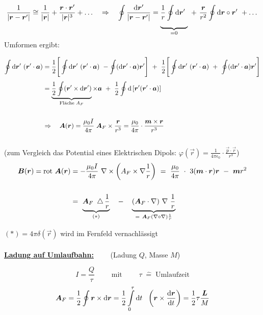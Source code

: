 \begin{equation*}
\frac{1}{|\vec{r}-\vec{r}'|} \cong  \frac{1}{|\vec{r}|} + \frac{\vec{r}\cdot\vec{r}'}{|\vec{r}|^3} + \dotsc \quad \Rightarrow \quad \oint\frac{\mathrm{d}\vec{r}'}{|\vec{r}-\vec{r}'|} = \underbrace{\frac{1}{r} \Oint{}{}{\vec{r}'}}_{=0} \ + \ \frac{\vec{r}}{r^2}\oint\d\vec{r} \circ\vec{r}' \ + \dotsc
\end{equation*}
\newpage
Umformen ergibt:

\begin{align*}
\Oint{}{}{\vec{r}'} (\vec{r}'\cdot\vec{a}) &= \frac{1}{2}\Bigg[\Oint{}{}{\vec{r}'}(\vec{r}'\cdot\vec{a}) \ - \oint(\mathrm{d}\vec{r}'\cdot\vec{a})\vec{r}'\Bigg] \ + \ \frac{1}{2} \Bigg[\Oint{}{}{\vec{r}'}(\vec{r}'\cdot\vec{a}) \ + \ \oint(\mathrm{d}\vec{r}'\cdot\vec{a})\vec{r}'\Bigg]\\
&= \underbrace{\frac{1}{2}\oint(\vec{r}'\times\mathrm{d}\vec{r}')}_{\text{Fläche }A_F} \times\vec{a} \ + \ \frac{1}{2} \oint\mathrm{d}\left[\vec{r}'(\vec{r}'\cdot\vec{a})\right]\\ 
\ \\
& \Rightarrow \quad \vec{A}(\vec{r}) = \frac{\mu_0 I }{4\pi} \; \vec{A}_F\times\frac{\vec{r}}{r^3} = \frac{\mu_0}{4\pi} \cdot \frac{\vec{m}\times\vec{r}}{r^3}
\end{align*}
\ \\
(zum Vergleich das Potential eines Elektrischen Dipols: $\varphi(\vec{r}) = \frac{1}{4\pi\epsilon_0} \cdot \frac{\vec{p}\cdot\vec{r}}{r^3}$)
\ \\
\begin{align*}
\vec{B}(\vec{r}) = \rot\vec{A}(\vec{r}) &= - \frac{\mu_0 I}{4\pi} \ \nabla \times \left(A_F\times\nabla\frac{1}{r}\right) \ = \ \frac{\mu_0}{4\pi} \ \cdot \ 3(\vec{m}\cdot\vec{r})\vec{r} \ - \ \vec{m}r^2\\
\ \\
&= \ \underbrace{\vec{A}_F \ \laplace\frac{1}{r}}_{(*)} \quad - \quad \underbrace{(\vec{A}_F
\cdot\nabla)\ \nabla \ \frac{1}{r}}_{= \ \vec{A}_F (\nabla \circ \nabla) \frac{1}{r}}
\end{align*}

$(*) = 4\pi\delta(\vec{r})$ wird im Fernfeld vernachlässigt
\ \\
\ \\
\underline{\textbf{Ladung auf Umlaufbahn:}}$\qquad$ (Ladung $Q$, Masse $M$)

\begin{equation*}
I = \frac{Q}{\tau} \qquad \text{ mit } \qquad \tau \; \hat{=} \; \text{Umlaufzeit}
\end{equation*}
\begin{equation*}
\vec{A}_F = \frac{1}{2}\oint\vec{r}\times\mathrm{d}\vec{r} = \frac{1}{2}\Int{0}{\tau}{t} \ \left(\vec{r}\times\diff{\vec{r}}{t}\right) =\frac{1}{2}\tau \frac{\vec{L}}{M}
\end{equation*}

